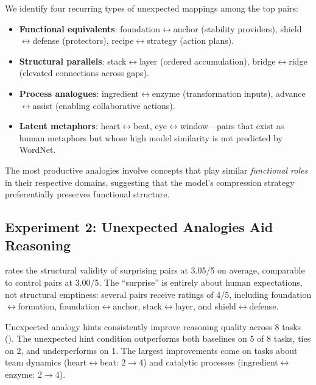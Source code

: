 We identify four recurring types of unexpected mappings among the top pairs:
\begin{itemize}[leftmargin=*,itemsep=0pt,topsep=0pt]
    \item \textbf{Functional equivalents}: foundation$\leftrightarrow$anchor (stability providers), shield$\leftrightarrow$defense (protectors), recipe$\leftrightarrow$strategy (action plans).
    \item \textbf{Structural parallels}: stack$\leftrightarrow$layer (ordered accumulation), bridge$\leftrightarrow$ridge (elevated connections across gaps).
    \item \textbf{Process analogues}: ingredient$\leftrightarrow$enzyme (transformation inputs), advance$\leftrightarrow$assist (enabling collaborative actions).
    \item \textbf{Latent metaphors}: heart$\leftrightarrow$beat, eye$\leftrightarrow$window---pairs that exist as human metaphors but whose high model similarity is not predicted by WordNet.
\end{itemize}

The most productive analogies involve concepts that play similar \emph{functional roles} in their respective domains, suggesting that the model's compression strategy preferentially preserves functional structure.

\subsection{Experiment 2: Unexpected Analogies Aid Reasoning}
\label{sec:results_exp2}

\gptfour rates the structural validity of surprising pairs at 3.05/5 on average, comparable to control pairs at 3.00/5.
The ``surprise'' is entirely about human expectations, not structural emptiness: several pairs receive ratings of 4/5, including foundation$\leftrightarrow$formation, foundation$\leftrightarrow$anchor, stack$\leftrightarrow$layer, and shield$\leftrightarrow$defense.

Unexpected analogy hints consistently improve reasoning quality across 8 tasks ().
The unexpected hint condition outperforms both baselines on 5 of 8 tasks, ties on 2, and underperforms on 1.
The largest improvements come on tasks about team dynamics (heart$\leftrightarrow$beat: 2$\to$4) and catalytic processes (ingredient$\leftrightarrow$enzyme: 2$\to$4).


